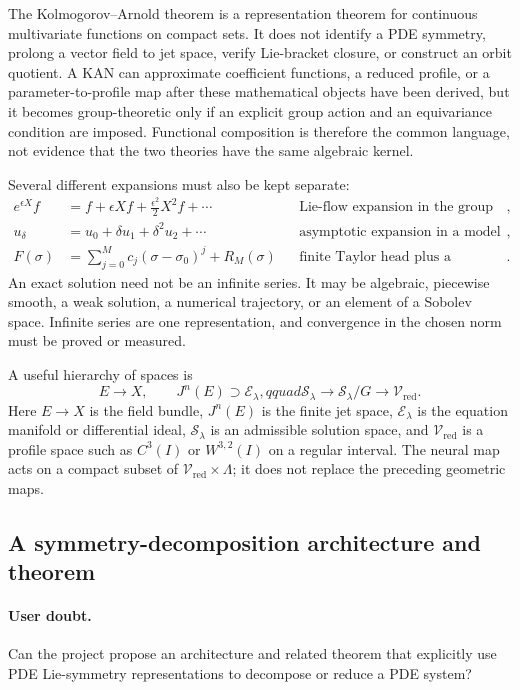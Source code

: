 \documentclass[11pt]{article}
\begin{document}
The Kolmogorov--Arnold theorem is a representation theorem for continuous
multivariate functions on compact sets.  It does not identify a PDE symmetry,
prolong a vector field to jet space, verify Lie-bracket closure, or construct an
orbit quotient.  A KAN can approximate coefficient functions, a reduced profile,
or a parameter-to-profile map after these mathematical objects have been derived,
but it becomes group-theoretic only if an explicit group action and an
equivariance condition are imposed.  Functional composition is therefore the
common language, not evidence that the two theories have the same algebraic
kernel.

Several different expansions must also be kept separate:
\begin{align*}
 e^{\epsilon X}f
   &= f+\epsilon Xf+\frac{\epsilon^2}{2}X^2f+\cdots
      &&\text{Lie-flow expansion in the group parameter},\\
 u_\delta
   &=u_0+\delta u_1+\delta^2u_2+\cdots
      &&\text{asymptotic expansion in a model perturbation},\\
 F(\sigma)
   &=\sum_{j=0}^{M}c_j(\sigma-\sigma_0)^j+R_M(\sigma)
      &&\text{finite Taylor head plus a controlled remainder}.
\end{align*}
An exact solution need not be an infinite series.  It may be algebraic,
piecewise smooth, a weak solution, a numerical trajectory, or an element of a
Sobolev space.  Infinite series are one representation, and convergence in the
chosen norm must be proved or measured.

A useful hierarchy of spaces is
\[
 E\longrightarrow X,\qquad
 J^n(E)\supset\mathcal E_\lambda,qquad
 \mathcal S_\lambda\longrightarrow
 \mathcal S_\lambda/G\longrightarrow\mathcal V_{\mathrm{red}}.
\]
Here $E\to X$ is the field bundle, $J^n(E)$ is the finite jet space,
$\mathcal E_\lambda$ is the equation manifold or differential ideal,
$\mathcal S_\lambda$ is an admissible solution space, and
$\mathcal V_{\mathrm{red}}$ is a profile space such as $C^3(I)$ or
$W^{3,2}(I)$ on a regular interval.  The neural map acts on a compact subset of
$\mathcal V_{\mathrm{red}}\times\Lambda$; it does not replace the preceding
geometric maps.

\subsection{A symmetry-decomposition architecture and theorem}

\paragraph{User doubt.}
Can the project propose an architecture and related theorem that explicitly use
PDE Lie-symmetry representations to decompose or reduce a PDE system?
\end{document}

